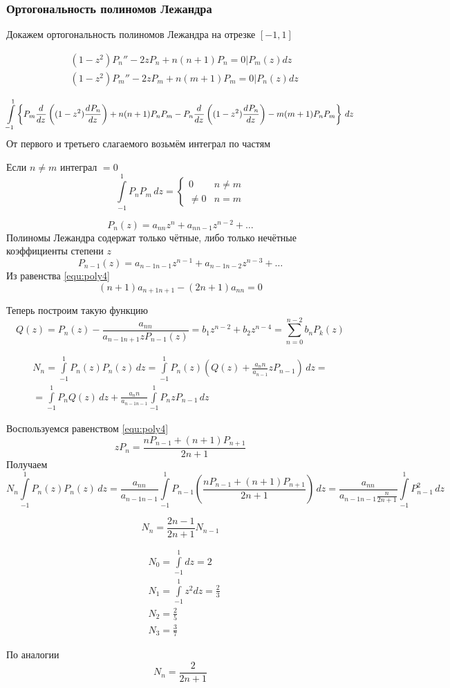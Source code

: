 \subsubsection{Ортогональность полиномов Лежандра}\label{que:28}
Докажем ортогональность полиномов Лежандра на отрезке $[-1, 1]$

\begin{align*}
    &(1 - z^2) P_n'' - 2 z P_n + n (n + 1) P_n = 0 | P_m(z) dz\\
	&(1 - z^2) P_m'' - 2 z P_m + n (m + 1) P_m = 0 | P_n(z) dz
\end{align*}

\[
    \int\limits_{-1}^1 \left\{ P_m \frac{d^{}}{dz^{}} \left((1 - z^2) \frac{d^{}P_n}{dz^{}}\right) + n (n + 1) P_n P_m - P_n \frac{d^{}}{dz^{}} \left((1 - z^2) \frac{d^{}P_n}{dz^{}}\right) - m (m + 1) P_n P_m\right\} \, dz
\]
От первого и третьего слагаемого возьмём интеграл по частям

Если $n \neq m$ интеграл $= 0$
\[
    \int\limits_{-1}^1 P_n P_m \,dz = \begin{cases} 0 & n \neq m \\ \neq 0 & n = m \end{cases}
\]

\[
    P_n(z) = a_{nn} z^n + a_{n n - 1} z^{n - 2} + \ldots
\]
Полиномы Лежандра содержат только чётные, либо только нечётные коэффициенты степени $z$
\[
    P_{n-1}(z) = a_{n-1n-1} z^{n-1} + a_{n-1 n - 2} z^{n - 3} + \ldots
\]
Из равенства \eqref{equ:poly4} 
\[
    (n + 1) a_{n+1 n + 1} - (2 n + 1) a_{nn} = 0
\]

Теперь построим такую функцию
\[
    Q(z) = P_n(z) - \frac{a_{nn}}{a_{n - 1 n + 1}z P_{n - 1} (z)} = b_1 z^{n -2} + b_2 z^{n - 4} = \sum\limits_{n = 0}^{n - 2} b_n P_k(z)
\]

\begin{multline}
    N_n = \int\limits_{-1}^{1} P_n(z) P_n(z) \, dz = \int\limits_{-1}^1 P_n(z) \left(Q(z) + \frac{a_nn}{a_{n - 1}} z P_{n - 1}\right) \, dz = \\
	= \int\limits_{-1}^1 P_n Q (z) \, dz + \frac{a_nn}{a_{n - 1 n - 1}} \int\limits_{-1}^1 P_n z P_{n - 1} \, dz
\end{multline}

Воспользуемся равенством \eqref{equ:poly4}
\[
   z P_n = \frac{n P_{n - 1} + (n + 1) P_{n + 1}}{2n + 1}
\]
Получаем
\[
    N_n \int\limits_{-1}^1 P_n(z) P_n (z) \, dz = \frac{a_{nn}}{a_{n -1 n - 1}} \int\limits_{-1}^1 P_{n - 1} \left( \frac{n P_{n - 1} + (n + 1) P_{n + 1}}{2n + 1} \right)\, dz = \frac{a_{nn}}{ a_{n - 1 n - 1} \frac{n}{2 n + 1}} \int\limits_{-1}^1 P_{n - 1}^2 \, dz
\]

\[
    N_n = \frac{2 n - 1}{2 n + 1} N_{n - 1}
\]

\begin{align*}
    &N_0 = \int\limits_{-1}^1  dz = 2\\
    &N_1 = \int\limits_{-1}^1 z^2 dz = \frac{2}{3}\\
    &N_2 =  \frac{2}{5}\\
    &N_3 =  \frac{3}{7}
\end{align*}

По аналогии
\[
    N_n = \frac{2}{2 n + 1}
\]





